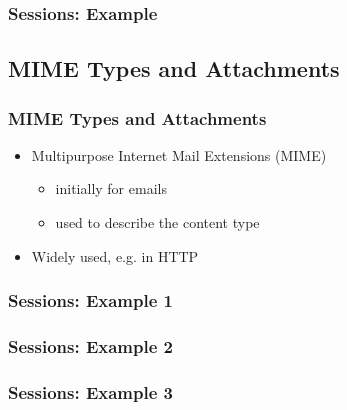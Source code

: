 \documentclass{beamer}
\begin{document}
\begin{frame}\frametitle{Sessions: Example}
 
    
 
\end{frame}




\subsection{MIME Types and Attachments} 
\begin{frame}\frametitle{MIME Types and Attachments}
 
  \begin{itemize}
  
    \item Multipurpose Internet Mail Extensions (MIME)
    \begin{itemize}
      \item initially for emails
      \item used to describe the content type
    \end{itemize}

    \item Widely used, e.g. in HTTP
    
  \end{itemize}

\end{frame}





\begin{frame}\frametitle{Sessions: Example 1}
 
    
 
\end{frame}





\begin{frame}\frametitle{Sessions: Example 2}
 
    
 
\end{frame}




\begin{frame}\frametitle{Sessions: Example 3}
 
    
 
\end{frame}
\end{document}
